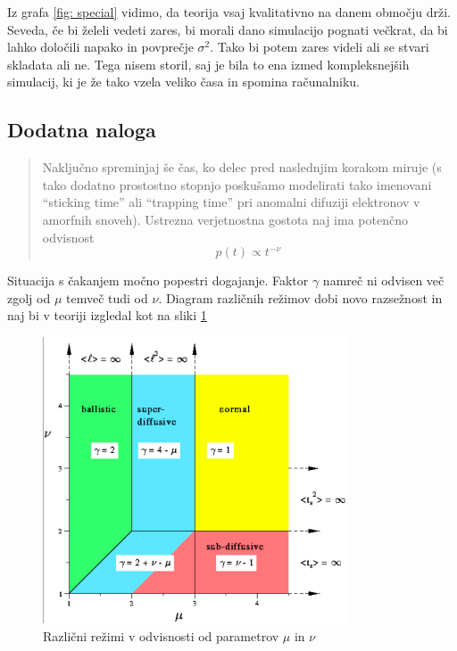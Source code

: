 \documentclass[slovene,11pt,a4paper]{article}
\begin{document}
Iz grafa \ref{fig: special} vidimo, da teorija vsaj kvalitativno na danem območju drži. Seveda, če bi želeli vedeti zares, bi morali dano simulacijo pognati večkrat, da bi lahko določili napako in povprečje $\sigma^2$. Tako bi potem zares videli ali se stvari skladata ali ne. Tega nisem storil, saj je bila to ena izmed kompleksnejših simulacij, ki je že tako vzela veliko časa in spomina računalniku.

\subsection{Dodatna naloga}

\begin{quote}
Naključno spreminjaj še čas,
ko delec pred naslednjim korakom miruje (s tako dodatno
prostostno stopnjo poskušamo modelirati tako imenovani
``sticking time'' ali ``trapping time'' pri anomalni difuziji
elektronov v amorfnih snoveh).  Ustrezna verjetnostna gostota
naj ima potenčno odvisnost
$$
p(t) \propto t^{-\nu} \>
$$
\end{quote}

Situacija s čakanjem močno popestri dogajanje. Faktor $\gamma$ namreč ni odvisen več zgolj od $\mu$ temveč tudi od $\nu$. Diagram različnih režimov dobi novo razsežnost in naj bi v teoriji izgledal kot na sliki \ref{fig: screen}

\begin{figure}[ht]
\begin{center}
  \includegraphics[width=9cm]{graphs/screen.png}
  \caption{Različni režimi v odvisnosti od parametrov $\mu$ in $\nu$}
  \label{fig: screen}
\end{center}
\end{figure}
\end{document}
